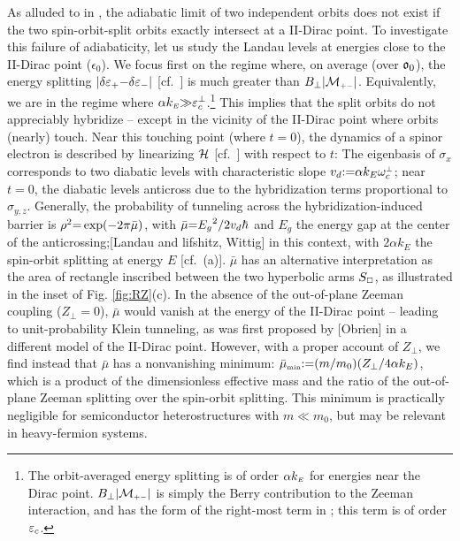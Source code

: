\documentclass[aps, prb, showpacs, twocolumn, notitlepage, superscriptaddress]{revtex4-1}
\begin{document}
As alluded to in , the adiabatic limit of two independent orbits does not exist if the two spin-orbit-split orbits exactly intersect at a II-Dirac point. To investigate this failure of adiabaticity, let us study the Landau levels at energies close to the II-Dirac point ($\epsilon_0$). We focus first on the regime where, on average (over $\mathfrak{o}_0$), the energy splitting $|\delta \varepsilon_+{-}\delta \varepsilon_-|$ [cf.\ ] is much greater than $B_\perp|{\cal M}_{\scriptscriptstyle{+-}}|$. Equivalently, we are in the regime where $\alpha k_{\scriptscriptstyle{E}}{\gg}\varepsilon_c^\perp$.\footnote{The orbit-averaged energy splitting is of order $\alpha k_{\scriptscriptstyle{E}}$ for energies near the Dirac point. $B_\perp|{\cal M}_{\scriptscriptstyle{+-}}|$ is simply the Berry contribution to the Zeeman interaction, and has the form of the right-most term in ; this term is of order $\varepsilon_c$.} This implies that the split orbits do not appreciably hybridize -- except in the vicinity of the II-Dirac point where orbits (nearly) touch.  Near this touching point (where $t{=}0$), the dynamics of a spinor electron is described by linearizing $\mathcal{H}$ [cf.\ ] with respect to $t$:
The eigenbasis of $\sigma_x$ corresponds to two diabatic levels with characteristic slope $v_d{:}{=}\alpha k_E\omega^{\scriptscriptstyle{\perp}}_c$; near $t{=}0$, the diabatic levels anticross  due to the hybridization terms proportional to $\sigma_{y,z}$. Generally, the probability of tunneling across the hybridization-induced barrier is  $\rho^2{=}\exp(-2\pi\bar{\mu})$, with $\bar{\mu}{=}{E_g}^2/{2v_d \hbar}$ and $E_g$ the energy gap at the center of the anticrossing;[Landau and lifshitz, Wittig] in this context,
with $2\alpha k_E$ the spin-orbit splitting at energy $E$ [cf.\ (a)]. $\bar{\mu}$ has an alternative interpretation as the area of rectangle inscribed between the two hyperbolic arms $S_{\scriptscriptstyle{\square}}$, as illustrated in the inset of Fig. \ref{fig:RZ}(c). In the absence of the out-of-plane Zeeman coupling ($Z_\perp{=}0$), $\bar{\mu}$ would vanish at the energy of the II-Dirac point -- leading to unit-probability Klein tunneling, as was first proposed by [Obrien] in a different model of the II-Dirac point. However, with a proper account of $Z_\perp$, we find instead that $\bar{\mu}$ has a nonvanishing minimum: $\bar{\mu}_{\scriptscriptstyle{\text{min}}}{:}{=} ( m/m_0)(Z_\perp/4\alpha k_{E})$, which is a product of the dimensionless effective mass and the ratio of the out-of-plane Zeeman splitting over the spin-orbit splitting. This minimum is practically negligible for  semiconductor heterostructures with $m{\ll}m_0$, but may be relevant in heavy-fermion systems. 
\end{document}
